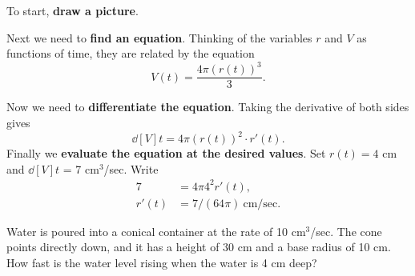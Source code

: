 \begin{solution}
To start, \textbf{draw a picture}.


Next we need to \textbf{find an equation}.  Thinking of the variables
$r$ and $V$ as functions of time, they are related by the equation
\[
V(t)=\frac{4\pi (r(t))^3}{3}.
\]

Now we need to \textbf{differentiate the equation}.  Taking the
derivative of both sides gives 
\[
\dd[V]{t}=4\pi (r(t))^2\cdot r'(t).
\]  
Finally we \textbf{evaluate the equation at the desired values}. Set
$r(t)= 4$ cm and $\dd[V]{t}$ = 7 cm$^3$/sec. Write 
\begin{align*}
7 &=4\pi 4^2r'(t),\\
r'(t) &=7/(64\pi)~\text{cm/sec}.
\end{align*}
\end{solution}

\begin{example} Water is poured into a conical container at the rate of 10
cm${}^3$/sec.  The cone points directly down, and it has a height of
30 cm and a base radius of 10 cm.  How fast is the water level rising
when the water is 4 cm deep?
\end{example}

